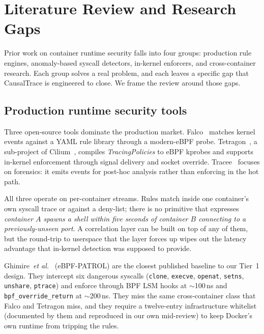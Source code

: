 \chapter{Literature Review and Research Gaps}
\label{Chapter2}

Prior work on container runtime security falls into four groups: production
rule engines, anomaly-based syscall detectors, in-kernel enforcers, and
cross-container research. Each group solves a real problem, and each leaves
a specific gap that CausalTrace is engineered to close. We frame the review
around those gaps.

\section{Production runtime security tools}
\label{sec:lit-production}

Three open-source tools dominate the production market. Falco~\cite{falco2024}
matches kernel events against a YAML rule library through a modern-eBPF
probe. Tetragon~\cite{tetragon2024}, a sub-project of
Cilium~\cite{cilium2024}, compiles \emph{TracingPolicies} to eBPF kprobes and
supports in-kernel enforcement through signal delivery and socket override.
Tracee~\cite{tracee2024} focuses on forensics: it emits events for post-hoc
analysis rather than enforcing in the hot path.

All three operate on per-container streams. Rules match inside one
container's own syscall trace or against a deny-list; there is no primitive
that expresses \emph{container $A$ spawns a shell within five seconds of
container $B$ connecting to a previously-unseen port}. A correlation layer
can be built on top of any of them, but the round-trip to userspace that
the layer forces up wipes out the latency advantage that in-kernel detection
was supposed to provide.

Ghimire~\emph{et al.}~\cite{ghimire2025patrol} (eBPF-PATROL) are the closest
published baseline to our Tier~1 design. They intercept six dangerous
syscalls (\texttt{clone}, \texttt{execve}, \texttt{openat}, \texttt{setns},
\texttt{unshare}, \texttt{ptrace}) and enforce through BPF LSM hooks at
$\sim$100\,ns and \texttt{bpf\_override\_return} at $\sim$200\,ns. They
miss the same cross-container class that Falco and Tetragon miss, and they
require a twelve-entry infrastructure whitelist (documented by them and
reproduced in our own mid-review) to keep Docker's own runtime from
tripping the rules.

